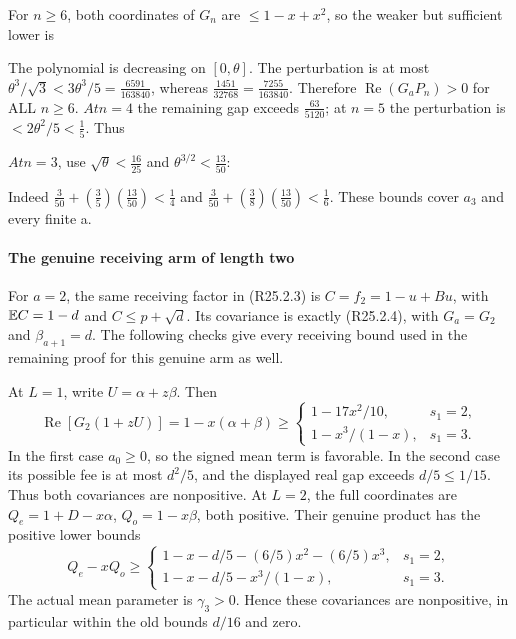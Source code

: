 For \(n\ge 6\), both coordinates of \(G_n\) are \(\le 1-x+x^2\), so the weaker but sufficient lower is


The polynomial is decreasing on \([0,\allowbreak \allowbreak \theta]\). The perturbation is at most \(\theta^3/\sqrt{3}<3\theta^3/5=\frac{6591}{163840}\), whereas \(\frac{1451}{32768}=\frac{7255}{163840}\). Therefore \(\operatorname{Re}(G_a P_n)>0\) for ALL \(n\ge 6\). \(At n=4\) the remaining gap exceeds \(\frac{63}{5120}\); at \(n=5\) the perturbation is \(<2\theta^2/5<\frac{1}{5}\). Thus


\(At n=3\), use \(\sqrt{\theta}<\frac{16}{25}\) and \(\theta^{3/2}<\frac{13}{50}\):


Indeed \(\frac{3}{50}+(\frac{3}{5})(\frac{13}{50})<\frac{1}{4}\) and \(\frac{3}{50}+(\frac{3}{8})(\frac{13}{50})<\frac{1}{6}\). These bounds cover \(a_{3}\) and every finite a.

\paragraph{The genuine receiving arm of length two}
\label{part:R25:genuine-two}
For \(a=2\), the same receiving factor in (R25.2.3) is
\(C=f_2=1-u+Bu\), with \(\mathbb E C=1-d\) and
\(C\le p+\sqrt d\). Its covariance is exactly (R25.2.4),
with \(G_a=G_2\) and \(\beta_{a+1}=d\).
The following checks give every receiving bound used in the remaining
proof for this genuine arm as well.

At \(L=1\), write \(U=\alpha+z\beta\). Then
\[
 \operatorname{Re}[G_2(1+zU)]=1-x(\alpha+\beta)
 \ge
 \begin{cases}
 1-17x^2/10,&s_1=2,\\
 1-x^3/(1-x),&s_1=3.
 \end{cases}
\]
In the first case \(a_0\ge0\), so the signed mean term is favorable.
In the second case its possible fee is at most \(d^2/5\), and the
displayed real gap exceeds \(d/5\le1/15\). Thus both covariances
are nonpositive.
At \(L=2\), the full coordinates are
\(Q_e=1+D-x\alpha\), \(Q_o=1-x\beta\), both positive.
Their genuine product has the positive lower bounds
\[
 Q_e-xQ_o\ge
 \begin{cases}
 1-x-d/5-(6/5)x^2-(6/5)x^3,&s_1=2,\\
 1-x-d/5-x^3/(1-x),&s_1=3.
 \end{cases}
\]
The actual mean parameter is \(\gamma_3>0\). Hence these
covariances are nonpositive, in particular within the old bounds
\(d/16\) and zero.

